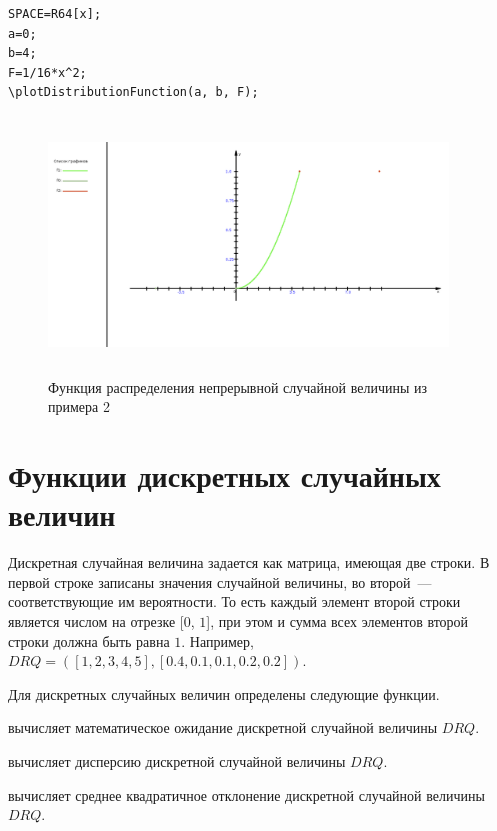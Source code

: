 \begin{verbatim}
SPACE=R64[x];
a=0;
b=4;
F=1/16*x^2;
\plotDistributionFunction(a, b, F);
\end{verbatim}

                       
\begin{figure}[!ht]
 \includegraphics[width=300.57pt, height=192.835pt]{pictures/8_2}
\caption{Функция распределения непрерывной случайной величины из примера 2}
\label{8_2}
\end{figure}

\section{Функции дискретных случайных величин}
Дискретная случайная величина задается как  матрица,  имеющая две строки.  В первой строке записаны значения случайной величины,  во второй~--- соответствующие им вероятности.  То есть каждый элемент второй строки является числом на отрезке [$0$,  $1$], при  этом и сумма всех элементов второй  строки должна быть равна $1$.  
Например,  $DRQ=([1, 2, 3, 4, 5], [0.4, 0.1, 0.1, 0.2, 0.2]).$ 


Для дискретных случайных величин  определены следующие функции. 

 вычисляет математическое ожидание дискретной случайной величины $DRQ$. 

 вычисляет дисперсию дискретной случайной величины $DRQ$. 

 вычисляет среднее квадратичное отклонение дискретной случайной величины $DRQ$. 

